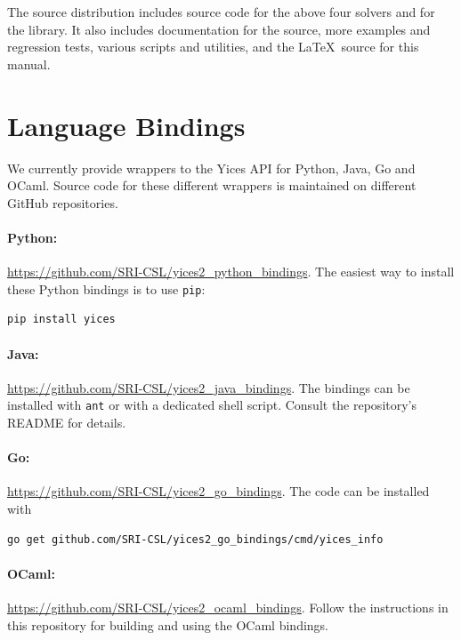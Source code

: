 \documentclass[11pt,twoside,fleqn,openright,titlepage]{cslreport}
\begin{document}
\medskip\noindent
The source distribution includes source code for the above four
solvers and for the library. It also includes documentation for the
source, more examples and regression tests, various scripts and
utilities, and the \LaTeX\ source for this manual.



\section{Language Bindings}
\label{python-bindings}

We currently provide wrappers to the Yices API for Python, Java, Go and
OCaml. Source code for these different wrappers is maintained on different GitHub repositories.

\paragraph{Python:} \url{https://github.com/SRI-CSL/yices2_python_bindings}. The easiest way
to install these Python bindings is to use \texttt{pip}:
\begin{small}
\begin{lstlisting}[language=sh]
  pip install yices
\end{lstlisting}
\end{small}

\paragraph{Java:} \url{https://github.com/SRI-CSL/yices2_java_bindings}. The bindings can be
installed with \texttt{ant} or with a dedicated shell script. Consult the repository's README
for details.

\paragraph{Go:} \url{https://github.com/SRI-CSL/yices2_go_bindings}.  The code can be installed with
\begin{small}
\begin{lstlisting}[language=sh]
  go get github.com/SRI-CSL/yices2_go_bindings/cmd/yices_info
\end{lstlisting}
\end{small}

\paragraph{OCaml:} \url{https://github.com/SRI-CSL/yices2_ocaml_bindings}.
Follow the instructions in this repository for building and using the OCaml bindings.
\end{document}
